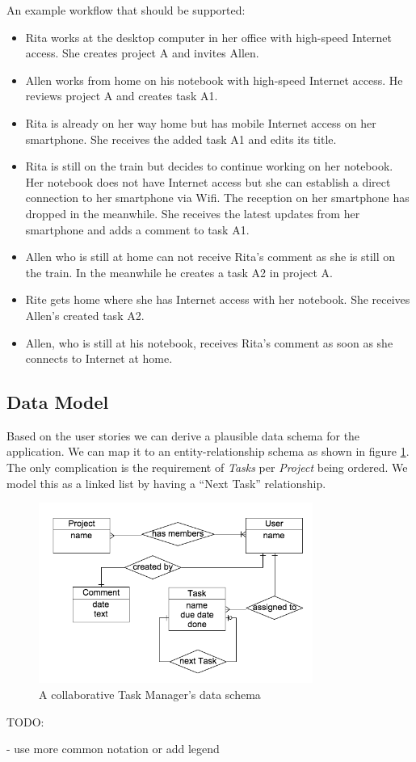 An example workflow that should be supported:\\

\begin{itemize}
\item Rita works at the desktop computer in her office with high-speed Internet access. She creates project A and invites Allen.
\item Allen works from home on his notebook with high-speed Internet access. He reviews project A and creates task A1.
\item Rita is already on her way home but has mobile Internet access on her smartphone. She receives the added task A1 and edits its title.
\item Rita is still on the train but decides to continue working on her notebook. Her notebook does not have Internet access but she can establish a direct connection to her smartphone via Wifi. The reception on her smartphone has dropped in the meanwhile. She receives the latest updates from her smartphone and adds a comment to task A1.
\item Allen who is still at home can not receive Rita's comment as she is still on the train. In the meanwhile he creates a task A2 in project A.
\item Rite gets home where she has Internet access with her notebook. She receives Allen's created task A2.
\item Allen, who is still at his notebook, receives Rita's comment as soon as she connects to Internet at home.
\end{itemize}

\subsection{Data Model}
Based on the user stories we can derive a plausible data schema for the application. We can map it to an entity-relationship schema as shown in figure \ref{fig:tasks-data-schema}.\\
The only complication is the requirement of \emph{Tasks} per \emph{Project} being ordered. We model this as a linked list by having a ``Next Task'' relationship.

\begin{figure}[tasks-data-schema]
\centering
\includegraphics[width=0.8\textwidth]{img/tasks-schema}
\caption{A collaborative Task Manager's data schema}
\label{fig:tasks-data-schema}
\end{figure}

TODO:

- use more common notation or add legend
